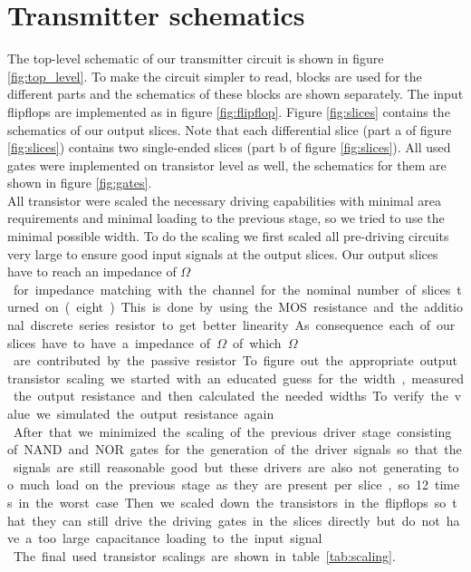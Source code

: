 \section{Transmitter schematics}

The top-level schematic of our transmitter circuit is shown in figure \ref{fig:top_level}. To make the circuit simpler to read, blocks are used for the different parts and the schematics of these blocks are shown separately. The input flipflops are implemented as in figure \ref{fig:flipflop}. Figure \ref{fig:slices} contains the schematics of our output slices. Note that each differential slice (part a of figure \ref{fig:slices}) contains two single-ended slices (part b of figure \ref{fig:slices}). All used gates were implemented on transistor level as well, the schematics for them are shown in figure \ref{fig:gates}.\\
All transistor were scaled the necessary driving capabilities with minimal area requirements and minimal loading to the previous stage, so we tried to use the minimal possible width. To do the scaling we first scaled all pre-driving circuits very large to ensure good input signals at the output slices. Our output slices have to reach an impedance of \unit[50]{$\Omega$} for impedance matching with the channel for the nominal number of slices turned on (eight). This is done by using the MOS resistance and the additional discrete series resistor to get better linearity. As consequence each of our slices have to have a impedance of \unit[400]{$\Omega$} of which \unit[300]{$\Omega$} are contributed by the passive resistor. To figure out the appropriate output transistor scaling we started with an educated guess for the width, measured the output resistance and then calculated the needed widths. To verify the value we simulated the output resistance again.\\
After that we minimized the scaling of the previous driver stage consisting of NAND and NOR gates for the generation of the driver signals so that the signals are still reasonable good but these drivers are also not generating too much load on the previous stage as they are present per slice, so 12 times in the worst case. Then we scaled down the transistors in the flipflops so that they can still drive the driving gates in the slices directly but do not have a too large capacitance loading to the input signal.\\
The final used transistor scalings are shown in table \ref{tab:scaling}.

